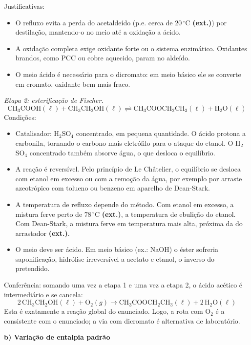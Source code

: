 \documentclass{article}%
\begin{document}
Justificativas:
\begin{itemize}
\item O refluxo evita a perda do acetaldeído (p.e. cerca de $20\,^\circ$C \textbf{(ext.)}) por destilação, mantendo-o no meio até a oxidação a ácido.
\item A oxidação completa exige oxidante forte ou o sistema enzimático. Oxidantes brandos, como PCC ou cobre aquecido, param no aldeído.
\item O meio ácido é necessário para o dicromato: em meio básico ele se converte em cromato, oxidante bem mais fraco.
\end{itemize}

\textit{Etapa 2: esterificação de Fischer.}
\[
\text{CH}_3\text{COOH}(\ell) + \text{CH}_3\text{CH}_2\text{OH}(\ell) \rightleftharpoons \text{CH}_3\text{COOCH}_2\text{CH}_3(\ell) + \text{H}_2\text{O}(\ell)
\]
Condições:
\begin{itemize}
\item Catalisador: H$_2$SO$_4$ concentrado, em pequena quantidade. O ácido protona a carbonila, tornando o carbono mais eletrófilo para o ataque do etanol. O H$_2$SO$_4$ concentrado também absorve água, o que desloca o equilíbrio.
\item A reação é reversível. Pelo princípio de Le Châtelier, o equilíbrio se desloca com etanol em excesso ou com a remoção da água, por exemplo por arraste azeotrópico com tolueno ou benzeno em aparelho de Dean-Stark.
\item A temperatura de refluxo depende do método. Com etanol em excesso, a mistura ferve perto de $78\,^\circ$C \textbf{(ext.)}, a temperatura de ebulição do etanol. Com Dean-Stark, a mistura ferve em temperatura mais alta, próxima da do arrastador \textbf{(ext.)}.
\item O meio deve ser ácido. Em meio básico (ex.: NaOH) o éster sofreria saponificação, hidrólise irreversível a acetato e etanol, o inverso do pretendido.
\end{itemize}

Conferência: somando uma vez a etapa 1 e uma vez a etapa 2, o ácido acético é intermediário e se cancela:
\[
2\,\text{CH}_3\text{CH}_2\text{OH}(\ell) + \text{O}_2(g) \longrightarrow \text{CH}_3\text{COOCH}_2\text{CH}_3(\ell) + 2\,\text{H}_2\text{O}(\ell)
\]
Esta é exatamente a reação global do enunciado. Logo, a rota com O$_2$ é a consistente com o enunciado; a via com dicromato é alternativa de laboratório.

\textbf{b) Variação de entalpia padrão}
\end{document}
